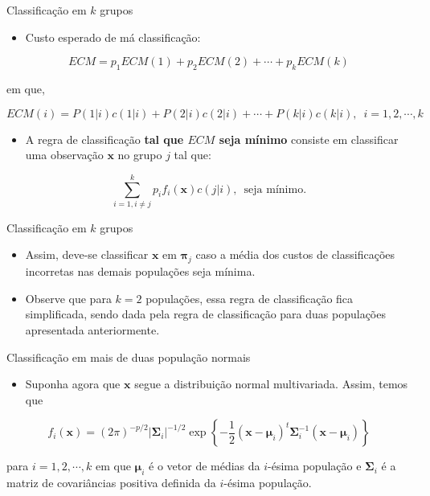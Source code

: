\documentclass[
  ignorenonframetext,
  aspectratio=169,
]{beamer}
\providecommand{\tightlist}{%
  \setlength{\itemsep}{0pt}\setlength{\parskip}{0pt}}
\begin{document}
\begin{frame}{Classificação em \(k\) grupos}
\label{classificauxe7uxe3o-em-k-grupos-1}
\begin{itemize}
\tightlist
\item
  Custo esperado de má classificação:
\end{itemize}

\[ECM = p_1 ECM(1) + p_2 ECM(2) + \cdots + p_k ECM(k)\]

em que,

\[ECM(i) = P(1|i)c(1|i) + P(2|i)c(2|i) + \cdots + P(k|i)c(k|i), \,\,\, i = 1, 2, \cdots, k\]

\pause

\begin{itemize}
\tightlist
\item
  A regra de classificação \textbf{tal que \(ECM\) seja mínimo} consiste
  em classificar uma observação \(\boldsymbol{x}\) no grupo \(j\) tal
  que:
\end{itemize}

\[\displaystyle{\sum_{i=1, i \neq j}^kp_if_i(\boldsymbol{x})c(j|i)}, \,\,\, \text{seja mínimo.}\]
\end{frame}

\begin{frame}{Classificação em \(k\) grupos}
\label{classificauxe7uxe3o-em-k-grupos-2}
\begin{itemize}
\tightlist
\item
  Assim, deve-se classificar \(\boldsymbol{x}\) em
  \(\boldsymbol{\pi}_j\) caso a média dos custos de classificações
  incorretas nas demais populações seja mínima.
\end{itemize}

\pause

\begin{itemize}
\tightlist
\item
  Observe que para \(k = 2\) populações, essa regra de classificação
  fica simplificada, sendo dada pela regra de classificação para duas
  populações apresentada anteriormente.
\end{itemize}
\end{frame}

\begin{frame}{Classificação em mais de duas população normais}
\label{classificauxe7uxe3o-em-mais-de-duas-populauxe7uxe3o-normais}
\begin{itemize}
\tightlist
\item
  Suponha agora que \(\boldsymbol{x}\) segue a distribuição normal
  multivariada. Assim, temos que
\end{itemize}

\[f_i(\boldsymbol{x}) = \left( 2\pi\right) ^{-p/2}\left| \boldsymbol{\Sigma}_i \right| ^{-1/2} \exp\left\lbrace -\dfrac{1}{2} \left( \boldsymbol{x} - \boldsymbol{\mu}_i\right) ^t \boldsymbol{\Sigma}_i^{-1} \left( \boldsymbol{x} - \boldsymbol{\mu}_i\right) \right\rbrace \]

para \(i = 1,2, \cdots, k\) em que \(\boldsymbol{\mu}_i\) é o vetor de
médias da \(i\)-ésima população e \(\boldsymbol{\Sigma}_i\) é a matriz
de covariâncias positiva definida da \(i\)-ésima população.
\end{frame}
\end{document}
